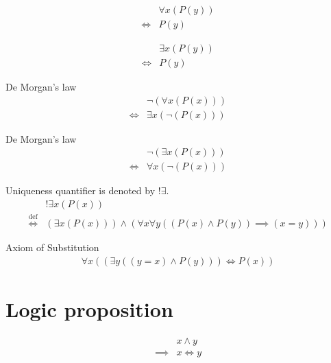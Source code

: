 \begin{axm}
\label{Axiom:forall_independent_variable}
\begin{align*}
& \forall x (P(y)) \\
\iff & P(y)
\end{align*}
\end{axm}

\begin{axm}
\label{Axiom:exists_independent_variable}
\begin{align*}
& \exists x (P(y)) \\
\iff & P(y)
\end{align*}
\end{axm}

\begin{axm}
\label{Axiom:De_Morgan_1}
De Morgan's law
\begin{align*}
& \lnot (\forall x (P(x))) \\
\iff & \exists x (\lnot (P(x)))
\end{align*}
\end{axm}

\begin{axm}
\label{Axiom:De_Morgan_2}
De Morgan's law
\begin{align*}
& \lnot (\exists x (P(x))) \\
\iff & \forall x (\lnot (P(x)))
\end{align*}
\end{axm}

\begin{defn}
\label{Definition:uniqueness_quantifier}
Uniqueness quantifier is denoted by $!\exists$.
\begin{align*}
& !\exists x (P(x)) \\
\overset{\operatorname{def}}{\iff} & (\exists x (P(x))) \land (\forall x \forall y ((P(x) \land P(y)) \implies (x = y)))
\end{align*}
\end{defn}

\begin{axm}
\label{Axiom:axiom_of_substitution}
Axiom of Substitution
\begin{align*}
\forall x ((\exists y ((y = x) \land P(y))) \iff P(x))
\end{align*}
\end{axm}

\section{Logic proposition}
\begin{prop}
\label{Proposition:land_implies_iff}
\begin{align*}
& x \land y \\
\implies & x \iff y
\end{align*}
\end{prop}

